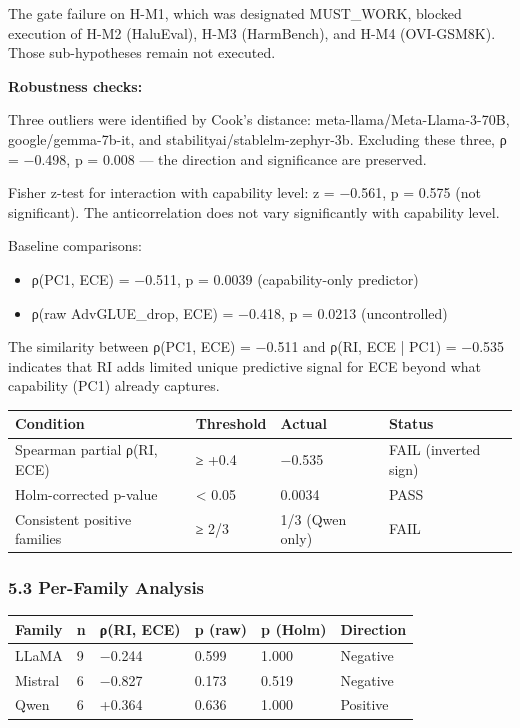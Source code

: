 The gate failure on H-M1, which was designated MUST_WORK, blocked execution of H-M2 (HaluEval), H-M3 (HarmBench), and H-M4 (OVI-GSM8K). Those sub-hypotheses remain not executed.

\textbf{Robustness checks:}

Three outliers were identified by Cook's distance: meta-llama/Meta-Llama-3-70B, google/gemma-7b-it, and stabilityai/stablelm-zephyr-3b. Excluding these three, ρ = −0.498, p = 0.008 — the direction and significance are preserved.

Fisher z-test for interaction with capability level: z = −0.561, p = 0.575 (not significant). The anticorrelation does not vary significantly with capability level.

Baseline comparisons:
\begin{itemize}
\item ρ(PC1, ECE) = −0.511, p = 0.0039 (capability-only predictor)
\item ρ(raw AdvGLUE_drop, ECE) = −0.418, p = 0.0213 (uncontrolled)
\end{itemize}

The similarity between ρ(PC1, ECE) = −0.511 and ρ(RI, ECE | PC1) = −0.535 indicates that RI adds limited unique predictive signal for ECE beyond what capability (PC1) already captures.

\begin{table}[htbp]
\centering
\begin{tabular}{llll}
\toprule
Condition & Threshold & Actual & Status \\
\midrule
Spearman partial ρ(RI, ECE) & ≥ +0.4 & −0.535 & FAIL (inverted sign) \\
Holm-corrected p-value & < 0.05 & 0.0034 & PASS \\
Consistent positive families & ≥ 2/3 & 1/3 (Qwen only) & FAIL \\
\bottomrule
\end{tabular}
\end{table}

\subsubsection{5.3 Per-Family Analysis}

\begin{table}[htbp]
\centering
\begin{tabular}{llllll}
\toprule
Family & n & ρ(RI, ECE) & p (raw) & p (Holm) & Direction \\
\midrule
LLaMA & 9 & −0.244 & 0.599 & 1.000 & Negative \\
Mistral & 6 & −0.827 & 0.173 & 0.519 & Negative \\
Qwen & 6 & +0.364 & 0.636 & 1.000 & Positive \\
\bottomrule
\end{tabular}
\end{table}

